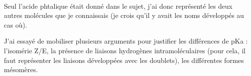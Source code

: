 \hrulefill\\

Seul l’acide phtalique était donné dans le sujet, j’ai donc représenté les deux autres molécules que je connaissais (je crois qu’il y avait les noms développés au cas où).\\

\begin{center}
\end{center}

J’ai essayé de mobiliser plusieurs arguments pour justifier les différences de pKa : l’isomérie Z/E, la présence de liaisons hydrogènes intramoléculaires (pour cela, il faut représenter les liaisons développées avec les doublets), les différentes formes mésomères.


